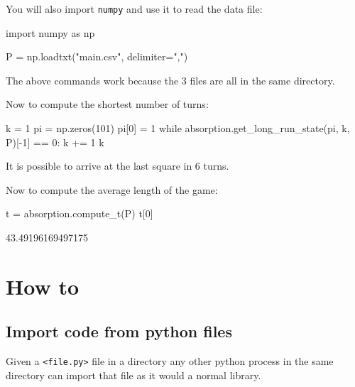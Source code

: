 You will also import \texttt{numpy} and use it to read the data file:

\begin{pyin}
import numpy as np

P = np.loadtxt("main.csv", delimiter=",")
\end{pyin}

\begin{note}
The above commands work because the 3 files are all in the same directory.
\end{note}



Now to compute the shortest number of turns:




\begin{pyin}
k = 1
pi = np.zeros(101)
pi[0] = 1
while absorption.get_long_run_state(pi, k, P)[-1] == 0:
    k += 1
k
\end{pyin}





It is possible to arrive at the last square in 6 turns.


Now to compute the average length of the game:





\begin{pyin}
t = absorption.compute_t(P)
t[0]
\end{pyin}



\begin{raw}
43.49196169497175
\end{raw}




\section{How to}
\label{\detokenize{building-tools/05-modularisation/how/main:how}}\label{\detokenize{building-tools/05-modularisation/how/main::doc}}

\subsection{Import code from python files}
\label{\detokenize{building-tools/05-modularisation/how/main:how-to-import-code-from-python-files}}

Given a \texttt{<file.py>} file in a directory any other python process in the
same directory can import that file as it would a normal library.


